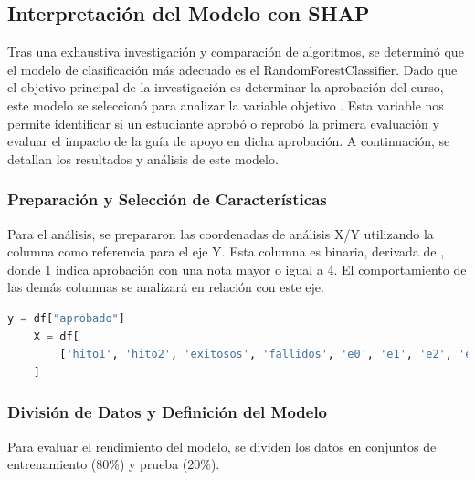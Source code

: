 \subsection{Interpretación del Modelo con SHAP}

Tras una exhaustiva investigación y comparación de algoritmos, se determinó que el modelo de clasificación más adecuado es el RandomForestClassifier. Dado que el objetivo principal de la investigación es determinar la aprobación del curso, este modelo se seleccionó para analizar la variable objetivo . Esta variable nos permite identificar si un estudiante aprobó o reprobó la primera evaluación y evaluar el impacto de la guía de apoyo en dicha aprobación. A continuación, se detallan los resultados y análisis de este modelo.

\subsubsection{Preparación y Selección de Características}

Para el análisis, se prepararon las coordenadas de análisis X/Y utilizando la columna  como referencia para el eje Y. Esta columna es binaria, derivada de , donde 1 indica aprobación con una nota mayor o igual a 4. El comportamiento de las demás columnas se analizará en relación con este eje.


\begin{lstlisting}[language=Python, caption=Selección de características y variable objetivo para RandomForestClassifier, label=lst:seleccion_caracteristicasRFC]
    y = df["aprobado"]
    X = df[
        ['hito1', 'hito2', 'exitosos', 'fallidos', 'e0', 'e1', 'e2', 'e3', 'e4', 'e5', 'e6', 'e7', 'e8', 'e9', 'e10', 'e11', 'e12', 'e13', 'e14', 'e15', 'e16', 'e17', 'e18', 'e19', 'e20', 'e21', 'e22', 'e23', 'e24', 'e25', 'e26', 'e27', 'e28', 'e29', 'e30', 'e31', 'e32', 'e33', 'e34', 'e35', 'e36', 'e37', 'e38', 'e39', 'e40', 'e41', 'e42', 'e43', 'e44', 'e45', 'e46', 'e47', 'e48', 'e49', 'e50', 'e51', 'e52']
    ]
\end{lstlisting}

\subsubsection{División de Datos y Definición del Modelo}

Para evaluar el rendimiento del modelo, se dividen los datos en conjuntos de entrenamiento (80\%) y prueba (20\%).

